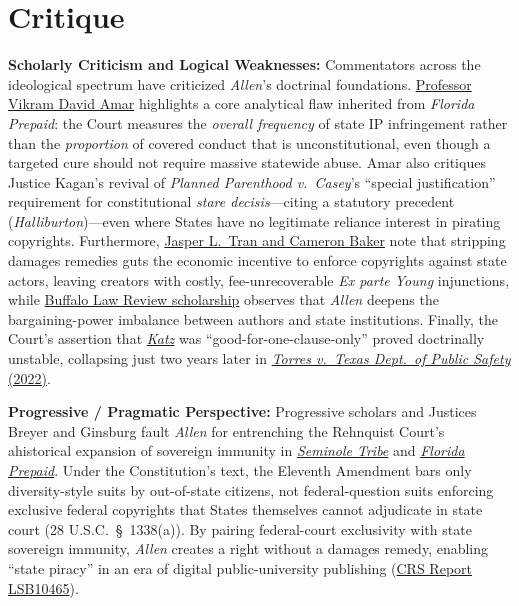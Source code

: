 \documentclass[12pt]{article}
\begin{document}
\section{Critique}
\textbf{Scholarly Criticism and Logical Weaknesses:} Commentators across the ideological spectrum have criticized \textit{Allen}'s doctrinal foundations. \href{https://verdict.justia.com/2020/04/10/how-allen-v-cooper-breaks-important-new-if-dubious-ground-on-stare-decisis}{Professor Vikram David Amar} highlights a core analytical flaw inherited from \textit{Florida Prepaid}: the Court measures the \textit{overall frequency} of state IP infringement rather than the \textit{proportion} of covered conduct that is unconstitutional, even though a targeted cure should not require massive statewide abuse. Amar also critiques Justice Kagan's revival of \textit{Planned Parenthood v.\ Casey}'s ``special justification'' requirement for constitutional \textit{stare decisis}---citing a statutory precedent (\textit{Halliburton})---even where States have no legitimate reliance interest in pirating copyrights. Furthermore, \href{https://www.gwlr.org/allen-v-cooper-states-stay-copyright-pirates/}{Jasper L.\ Tran and Cameron Baker} note that stripping damages remedies guts the economic incentive to enforce copyrights against state actors, leaving creators with costly, fee-unrecoverable \textit{Ex parte Young} injunctions, while \href{https://digitalcommons.law.buffalo.edu/buffalolawreview/vol69/iss2/3/}{Buffalo Law Review scholarship} observes that \textit{Allen} deepens the bargaining-power imbalance between authors and state institutions. Finally, the Court's assertion that \href{https://supreme.justia.com/cases/federal/us/546/356/}{\textit{Katz}} was ``good-for-one-clause-only'' proved doctrinally unstable, collapsing just two years later in \href{https://supreme.justia.com/cases/federal/us/597/20-603/}{\textit{Torres v.\ Texas Dept.\ of Public Safety} (2022)}.

\textbf{Progressive / Pragmatic Perspective:} Progressive scholars and Justices Breyer and Ginsburg fault \textit{Allen} for entrenching the Rehnquist Court's ahistorical expansion of sovereign immunity in \href{https://supreme.justia.com/cases/federal/us/517/44/}{\textit{Seminole Tribe}} and \href{https://supreme.justia.com/cases/federal/us/527/627/}{\textit{Florida Prepaid}}. Under the Constitution's text, the Eleventh Amendment bars only diversity-style suits by out-of-state citizens, not federal-question suits enforcing exclusive federal copyrights that States themselves cannot adjudicate in state court (28 U.S.C.\ \S~1338(a)). By pairing federal-court exclusivity with state sovereign immunity, \textit{Allen} creates a right without a damages remedy, enabling ``state piracy'' in an era of digital public-university publishing (\href{https://www.everycrsreport.com/reports/LSB10465.html}{CRS Report LSB10465}).
\end{document}
